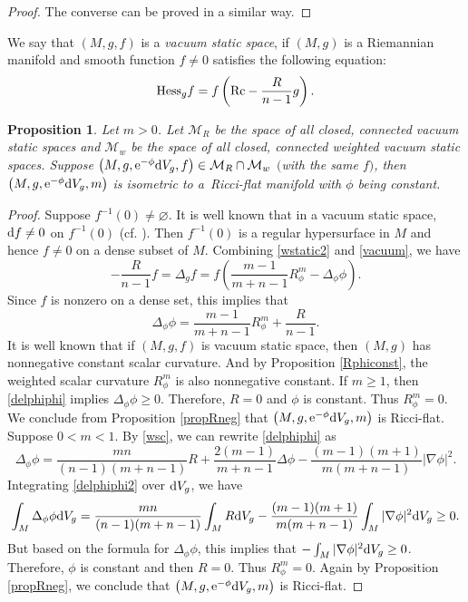 \documentclass[10pt,a4paper]{amsart}
\numberwithin{equation}{section}
\newtheorem{Proposition}[Theorem]{Proposition}
 { \theoremstyle{definition}
\newtheorem{Definition}[Theorem]{Definition}
\newtheorem{Note}[Theorem]{Note}
\newtheorem{Example}[Theorem]{Example}
\newtheorem{Remark}[Theorem]{Remark} }
\begin{document}
\begin{proof}
The converse can be proved in a similar way.
\end{proof}

We say that $(M,g,f)$ is a \textit{vacuum static space}, if $(M,g)$ is a Riemannian manifold and smooth function $f\neq0$ satisfies the following equation:
\begin{equation}\label{vacuum}
 {\rm Hess}_g f=f\left({\rm Rc}-\frac{R}{n-1}g\right).
\end{equation}

\begin{Proposition}
Let $m>0$. Let $\mathcal{M}_R$ be the space of all closed, connected vacuum static spaces and $\mathcal{M}_w$ be the space of all closed,
connected weighted vacuum static spaces. Suppose $\bigl(M,g,{\rm e}^{-\phi}{\rm d}V_g,f\bigr)\in \mathcal{M}_R\cap \mathcal{M}_w$ $($with the same $f)$, then $\bigl(M,g,{\rm e}^{-\phi}{\rm d}V_g,m\bigr)$ is isometric to a~Ricci-flat manifold with $\phi$ being constant.
\end{Proposition}
\begin{proof}
Suppose $f^{-1}(0)\neq \varnothing$. It is well known that in a vacuum static space, ${\rm d}f\neq0$ on $f^{-1}(0)$ (cf. \cite{Fischer&Marsden}). Then $f^{-1}(0)$ is a regular hypersurface in $M$ and hence $f\neq0$ on a dense subset of $M$. Combining \eqref{wstatic2} and \eqref{vacuum}, we have
 \begin{equation*}
 -\frac{R}{n-1}f=\Delta_gf=f\left(\frac{m-1}{m+n-1}R_\phi^m-\Delta_\phi\phi\right).
 \end{equation*}
Since $f$ is nonzero on a dense set, this implies that
\begin{equation}\label{delphiphi}
 \Delta_\phi\phi=\frac{m-1}{m+n-1}R_\phi^m+\frac{R}{n-1}.
\end{equation}
 It is well known that if $(M,g,f)$ is vacuum static space, then $(M,g)$ has nonnegative constant scalar curvature. And by Proposition \ref{Rphiconst}, the weighted scalar curvature $R_\phi^m$ is also nonnegative constant. If $m\geq1$, then \eqref{delphiphi} implies $\Delta_\phi\phi\geq0$. Therefore, $R=0$ and $\phi$ is constant. Thus $R_\phi^m=0$. We conclude from Proposition \ref{propRneg} that $\bigl(M,g,{\rm e}^{-\phi}{\rm d}V_g,m\bigr)$ is Ricci-flat. Suppose $0<m<1$. By \eqref{wsc}, we can rewrite \eqref{delphiphi} as
 \begin{equation}\label{delphiphi2}
 \Delta_\phi\phi=\frac{mn}{(n-1)(m+n-1)}R+\frac{2(m-1)}{m+n-1}\Delta \phi-\frac{(m-1)(m+1)}{m(m+n-1)}|\nabla \phi|^2.
 \end{equation}
 Integrating \eqref{delphiphi2} over ${\rm d}V_g$, we have
 \begin{equation*}
 \int_M \Delta_\phi\phi {\rm d}V_g=\frac{mn}{(n-1)(m+n-1)}\int_MR{\rm d}V_g-\frac{(m-1)(m+1)}{m(m+n-1)}\int_M|\nabla \phi|^2{\rm d}V_g\geq0.
 \end{equation*}
 But based on the formula for $\Delta_\phi\phi$, this implies that $-\int_M|\nabla \phi|^2{\rm d}V_g\geq0$. Therefore, $\phi$ is constant and then $R=0$. Thus $R_\phi^m=0$. Again by Proposition \ref{propRneg}, we conclude that $\bigl(M,g,{\rm e}^{-\phi}{\rm d}V_g,m\bigr)$ is Ricci-flat.
\end{proof}
\end{document}
